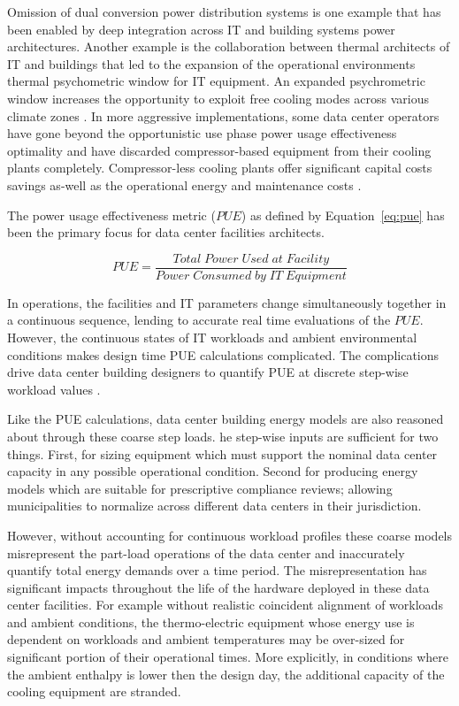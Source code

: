 {Omission of dual conversion power distribution systems is one example that has been enabled by deep integration across IT and building systems power architectures. Another example is the collaboration between thermal architects of IT and buildings that led to the expansion of the operational environment\textsc{}s thermal psychometric window for IT equipment. An expanded psychrometric window increases the opportunity to exploit free cooling modes across various climate zones \citep{ASHRAETC9.9}. In more aggressive implementations, some data center operators have gone beyond the opportunistic use phase power usage effectiveness optimality and have discarded compressor-based equipment from their cooling plants completely. Compressor-less cooling plants offer significant capital costs savings as-well as the operational energy and maintenance costs \citep{Mulay18}.} 

The power usage effectiveness metric ($PUE$) as defined by Equation~\ref{eq:pue} has been the primary focus for data center facilities architects. 

\begin{equation}\label{eq:pue}
  PUE  = \frac{Total\; Power\; Used\; at\; Facility}{Power\; Consumed\; by\; IT\; Equipment}
\end{equation}

In operations, the facilities and IT parameters change simultaneously together in a continuous sequence, lending to accurate real time evaluations of the $PUE$. However, the continuous states of IT workloads and ambient environmental conditions makes design time PUE calculations complicated. The complications drive data center building designers to quantify PUE at discrete step-wise workload values . 

Like the PUE calculations, data center building energy models are also reasoned about through these coarse step loads. he step-wise inputs are sufficient for two things. First, for sizing equipment which must support the nominal data center capacity in any possible operational condition. Second for producing energy models which are suitable for prescriptive compliance reviews; allowing  municipalities to normalize across different data centers in their jurisdiction. 

However, without accounting for continuous workload profiles these coarse models misrepresent the part-load operations of the data center and inaccurately quantify total energy demands over a time period. The misrepresentation has significant impacts throughout the life of the hardware deployed in these data center facilities. For example without realistic coincident alignment of workloads and ambient conditions, the thermo-electric equipment whose energy use is dependent on workloads and ambient temperatures may be over-sized for significant portion of their operational times. More explicitly, in conditions where the ambient enthalpy is lower then the design day, the additional capacity of the cooling equipment are stranded. 

